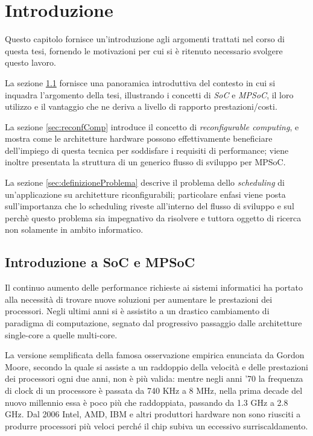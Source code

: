 \chapter{Introduzione}
\label{chap:intro}
\vspace{1cm}
Questo capitolo fornisce un'introduzione agli argomenti trattati nel corso di questa
tesi, fornendo le motivazioni per cui si \`e ritenuto necessario svolgere questo
lavoro.

La sezione \ref{sec:introSoC} fornisce una panoramica introduttiva del contesto in cui si
inquadra l'argomento della tesi, illustrando i concetti di \emph{\acl{SoC}} e
\emph{\acl{MPSoC}}, il loro utilizzo e il vantaggio che ne deriva a livello di
rapporto prestazioni/costi.

La sezione \ref{sec:reconfComp} introduce il concetto di \emph{reconfigurable computing},
e mostra come le architetture hardware possono effettivamente beneficiare dell'impiego
di questa tecnica per soddisfare i requisiti di performance; viene inoltre presentata
la struttura di un generico flusso di sviluppo per \acs{MPSoC}.

La sezione \ref{sec:definizioneProblema} descrive il problema dello \emph{scheduling} di un'applicazione
su architetture riconfigurabili; particolare enfasi viene posta sull'importanza che lo scheduling
riveste all'interno del flusso di sviluppo e sul perchè questo problema sia impegnativo da risolvere
e tuttora oggetto di ricerca non solamente in ambito informatico.

\newpage

\section[Introduzione a \acs{SoC} e \ac{MPSoC}]{Introduzione a \acs{SoC} e \ac{MPSoC}}
\label{sec:introSoC}
Il continuo aumento delle performance richieste ai sistemi informatici ha portato alla necessit\`a
di trovare nuove soluzioni per aumentare le prestazioni dei processori. Negli ultimi anni si \`e
assistito a un drastico cambiamento di paradigma di computazione, segnato dal progressivo passaggio
dalle architetture single-core a quelle multi-core.

La versione semplificata della famosa osservazione empirica enunciata da Gordon Moore, secondo la quale
si assiste a un raddoppio della velocit\`a e delle prestazioni dei processori ogni due anni, non \`e
pi\`u valida: mentre negli anni '70 la frequenza di clock di un processore \`e passata da 740 KHz a
8 MHz, nella prima decade del nuovo millennio essa \`e poco pi\`u che raddoppiata, passando da 1.3 GHz
a 2.8 GHz. Dal 2006 Intel, AMD, IBM e altri produttori hardware non sono riusciti a produrre
processori pi\`u veloci perch\'e il chip subiva un eccessivo surriscaldamento.

